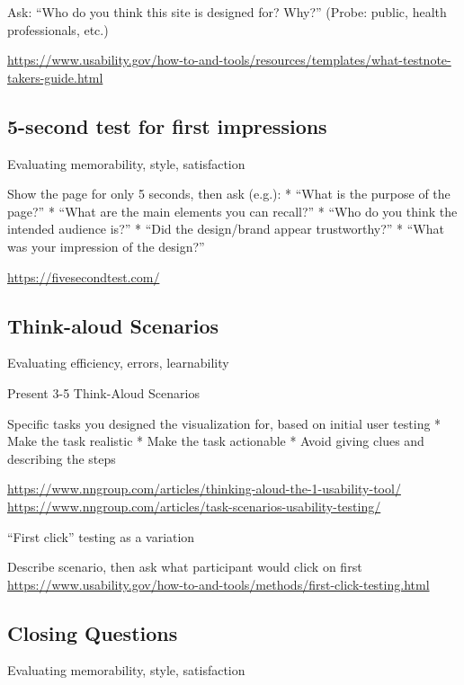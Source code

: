 \documentclass[
]{krantz}
\begin{document}
Ask: ``Who do you think this site is designed for? Why?''
(Probe: public, health professionals, etc.)

\url{https://www.usability.gov/how-to-and-tools/resources/templates/what-testnote-takers-guide.html}

\hypertarget{second-test-for-first-impressions}{%
\subsection{5-second test for first impressions}\label{second-test-for-first-impressions}}

Evaluating memorability, style, satisfaction

Show the page for only 5 seconds, then ask (e.g.):
* ``What is the purpose of the page?''
* ``What are the main elements you can recall?''
* ``Who do you think the intended audience is?''
* ``Did the design/brand appear trustworthy?''
* ``What was your impression of the design?''

\url{https://fivesecondtest.com/}

\hypertarget{think-aloud-scenarios}{%
\subsection{Think-aloud Scenarios}\label{think-aloud-scenarios}}

Evaluating efficiency, errors, learnability

Present 3-5 Think-Aloud Scenarios

Specific tasks you designed the visualization for, based on initial user testing
* Make the task realistic
* Make the task actionable
* Avoid giving clues and describing the steps

\url{https://www.nngroup.com/articles/thinking-aloud-the-1-usability-tool/}
\url{https://www.nngroup.com/articles/task-scenarios-usability-testing/}

``First click'' testing as a variation

Describe scenario, then ask what participant would click on first
\url{https://www.usability.gov/how-to-and-tools/methods/first-click-testing.html}

\hypertarget{closing-questions}{%
\subsection{Closing Questions}\label{closing-questions}}

Evaluating memorability, style, satisfaction
\end{document}
